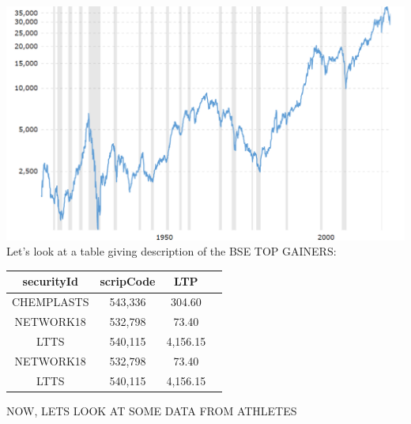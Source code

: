 \documentclass{article}
\begin{document}
\begin{LARGE}

\includegraphics[width=\textwidth]{trends}
\\
Let's look at a table giving description of the BSE TOP GAINERS:
\\
\begin{center}
\begin{tabular}{ ||c c c c|| }
\hline
 securityId & scripCode & LTP \\ 
 \hline
 CHEMPLASTS & 543,336 & 304.60 \\ 
 NETWORK18 & 532,798 & 73.40 \\  
 LTTS & 540,115 & 4,156.15  \\  
 NETWORK18 & 532,798 & 73.40 \\  
 LTTS & 540,115 & 4,156.15    
\end{tabular}
\end{center}
\end{LARGE}
\newpage
\begin{Large}
\begin{center}
NOW, LETS LOOK AT SOME DATA FROM ATHLETES


\end{center}


\end{Large}
\end{document}
